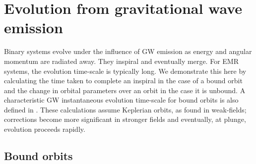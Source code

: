 \chapter{Evolution from gravitational wave emission}\label{ap:evolve}

Binary systems evolve under the influence of GW emission as energy and angular momentum are radiated away. They inspiral and eventually merge. For EMR systems, the evolution time-scale is typically long. We demonstrate this here by calculating the time taken to complete an inspiral in the case of a bound orbit and the change in orbital parameters over an orbit in the case it is unbound. A characteristic GW instantaneous evolution time-scale for bound orbits is also defined in . These calculations assume Keplerian orbits, as found in weak-fields; corrections become more significant in stronger fields and eventually, at plunge, evolution proceeds rapidly. 

\section{Bound orbits}\label{ap:Bound}

